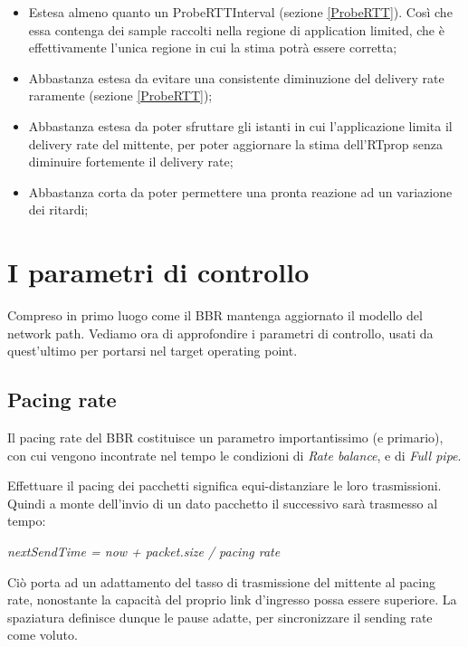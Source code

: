 \begin{itemize}

\item Estesa almeno quanto un ProbeRTTInterval (sezione \ref{ProbeRTT}). Così che essa contenga dei sample raccolti nella regione di application limited, che è effettivamente l'unica regione in cui la stima potrà essere corretta;

\item Abbastanza estesa da evitare una consistente diminuzione del delivery rate raramente (sezione \ref{ProbeRTT});

\item Abbastanza estesa da poter sfruttare gli istanti in cui l'applicazione limita il delivery rate del mittente, per poter aggiornare la stima dell'RTprop senza diminuire fortemente il delivery rate;

\item Abbastanza corta da poter permettere una pronta reazione ad un variazione dei ritardi;

\end{itemize}

\section{I parametri di controllo}

Compreso in primo luogo come il BBR mantenga aggiornato il modello del network path. Vediamo ora di approfondire i parametri di controllo, usati da quest'ultimo per portarsi nel target operating point.

\subsection{Pacing rate}

Il pacing rate del BBR costituisce un parametro importantissimo (e primario), con cui vengono incontrate nel tempo le condizioni di \textit{Rate balance}, e di \textit{Full pipe}. \bigskip

Effettuare il pacing dei pacchetti significa equi-distanziare le loro trasmissioni. Quindi a monte dell'invio di un dato pacchetto il successivo sarà trasmesso al tempo:

\begin{center}

\textit{nextSendTime = now + packet.size / pacing rate}

\end{center}

Ciò porta ad un adattamento del tasso di trasmissione del mittente al pacing rate, nonostante la capacità del proprio link d'ingresso possa essere superiore. La spaziatura definisce dunque le pause adatte, per sincronizzare il sending rate come voluto. \bigskip

